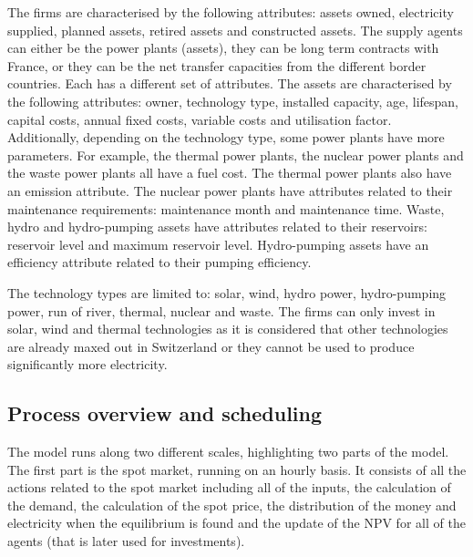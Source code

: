 The firms are characterised by the following attributes: assets owned, electricity supplied, planned assets, retired assets and constructed assets. The supply agents can either be the power plants (assets), they can be long term contracts with France, or they can be the net transfer capacities from the different border countries. Each has a different set of attributes. The assets are characterised by the following attributes: owner, technology type, installed capacity, age, lifespan, capital costs, annual fixed costs, variable costs and utilisation factor. Additionally, depending on the technology type, some power plants have more parameters. For example, the thermal power plants, the nuclear power plants and the waste power plants all have a fuel cost. The thermal power plants also have an emission attribute. The nuclear power plants have attributes related to their maintenance requirements: maintenance month and maintenance time. Waste, hydro and hydro-pumping assets have attributes related to their reservoirs: reservoir level and maximum reservoir level. Hydro-pumping assets have an efficiency attribute related to their pumping efficiency.

The technology types are limited to: solar, wind, hydro power, hydro-pumping power, run of river, thermal, nuclear and waste. The firms can only invest in solar, wind and thermal technologies as it is considered that other technologies are already maxed out in Switzerland or they cannot be used to produce significantly more electricity.



\subsection{Process overview and scheduling}
\label{ssec:process}

The model runs along two different scales, highlighting two parts of the model. The first part is the spot market, running on an hourly basis. It consists of all the actions related to the spot market including all of the inputs, the calculation of the demand, the calculation of the spot price, the distribution of the money and electricity when the equilibrium is found and the update of the NPV for all of the agents (that is later used for investments).

